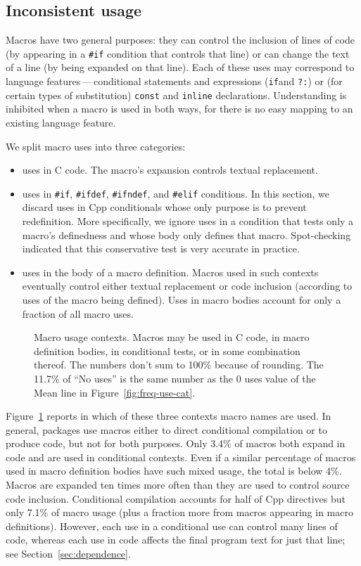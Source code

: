 \documentclass[10pt]{article}
\newcommand{\captionsmall}[1]{\caption[]{\small #1}}
\begin{document}
\subsection{Inconsistent usage}

Macros have two general purposes: they can control the inclusion of lines
of code (by appearing in a \texttt{\#if} condition that controls that line)
or can change the text of a line (by being expanded on that line).  Each of
these uses may correspond to language features\,---\,conditional statements
and expressions (\texttt{if}and {\tt ?:}) or (for certain types of
substitution) {\tt const} and {\tt inline} declarations.  Understanding is
inhibited when a macro is used in both ways, for there is no easy mapping
to an existing language feature.


We split macro uses into three categories:
\begin{itemize}\itemsep 0pt \parskip 0pt
\item uses in C code.   The macro's expansion controls textual
      replacement.
\item uses in \texttt{\#if}, \texttt{\#ifdef}, \texttt{\#ifndef}, and
  \texttt{\#elif} conditions.  In this section, we discard uses in Cpp
  conditionals whose only purpose is to prevent redefinition.  More
  specifically, we ignore uses in a condition that tests only a macro's
  definedness and whose body only defines that macro.  Spot-checking
  indicated that this conservative test is very accurate in practice.
\item uses in the body of a macro definition.
  Macros used in such contexts eventually control either textual
  replacement or code inclusion (according to uses of the macro being
  defined).  Uses in macro bodies account for only a fraction of all macro
  uses.
\end{itemize}

\begin{figure}
\centerline{\small
  \setlength{\tabcolsep}{.25em}
}
\captionsmall{Macro usage contexts.  Macros may be used in C code, in
  macro definition bodies, in conditional tests, or in some combination
  thereof.  The numbers don't sum to 100\% because of rounding.  The 11.7\%
  of ``No uses'' is the same number as the 0 uses value of the Mean line in
  Figure~\ref{fig:freq-use-cat}.}
\label{fig:where-used}
\end{figure}

Figure~\ref{fig:where-used} reports in which of these three contexts macro
names are used.  In general, packages use macros either to direct
conditional compilation or to produce code, but not for both purposes.
Only 3.4\% of macros both expand in code and are used in conditional
contexts.  Even if a similar percentage of macros used in macro definition
bodies have such mixed usage, the total is below 4\%.  Macros are expanded
ten times more often than they are used to control source code inclusion.
Conditional compilation accounts for half of Cpp directives but only 7.1\%
of macro usage (plus a fraction more from macros appearing in macro
definitions).  However, each use in a conditional use can control many
lines of code, whereas each use in code affects the final program text for
just that line; see Section~\ref{sec:dependence}.
\end{document}
